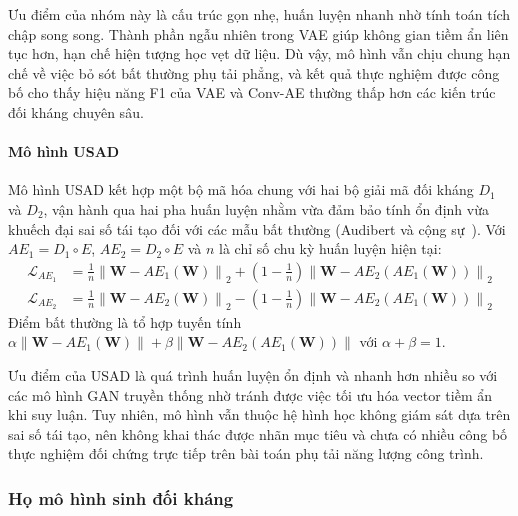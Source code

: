 Ưu điểm của nhóm này là cấu trúc gọn nhẹ, huấn luyện nhanh nhờ tính toán tích chập song song. Thành phần ngẫu nhiên trong VAE giúp không gian tiềm ẩn liên tục hơn, hạn chế hiện tượng học vẹt dữ liệu. Dù vậy, mô hình vẫn chịu chung hạn chế về việc bỏ sót bất thường phụ tải phẳng, và kết quả thực nghiệm được công bố cho thấy hiệu năng F1 của VAE và Conv-AE thường thấp hơn các kiến trúc đối kháng chuyên sâu.

\paragraph{Mô hình USAD}

Mô hình USAD kết hợp một bộ mã hóa chung với hai bộ giải mã đối kháng $D_1$ và $D_2$, vận hành qua hai pha huấn luyện nhằm vừa đảm bảo tính ổn định vừa khuếch đại sai số tái tạo đối với các mẫu bất thường (Audibert và cộng sự~\cite{usad}). Với $AE_1 = D_1 \circ E$, $AE_2 = D_2 \circ E$ và $n$ là chỉ số chu kỳ huấn luyện hiện tại:
\begin{equation*}
\begin{aligned}
    \mathcal{L}_{AE_1} &= \frac{1}{n}\left\| \mathbf{W} - AE_1(\mathbf{W}) \right\|_2 + \left(1 - \frac{1}{n}\right)\left\| \mathbf{W} - AE_2\left(AE_1(\mathbf{W})\right) \right\|_2 \\
    \mathcal{L}_{AE_2} &= \frac{1}{n}\left\| \mathbf{W} - AE_2(\mathbf{W}) \right\|_2 - \left(1 - \frac{1}{n}\right)\left\| \mathbf{W} - AE_2\left(AE_1(\mathbf{W})\right) \right\|_2
\end{aligned}
\end{equation*}
Điểm bất thường là tổ hợp tuyến tính $\alpha \left\| \mathbf{W} - AE_1(\mathbf{W}) \right\| + \beta \left\| \mathbf{W} - AE_2(AE_1(\mathbf{W})) \right\|$ với $\alpha + \beta = 1$.

Ưu điểm của USAD là quá trình huấn luyện ổn định và nhanh hơn nhiều so với các mô hình GAN truyền thống nhờ tránh được việc tối ưu hóa vector tiềm ẩn khi suy luận. Tuy nhiên, mô hình vẫn thuộc hệ hình học không giám sát dựa trên sai số tái tạo, nên không khai thác được nhãn mục tiêu và chưa có nhiều công bố thực nghiệm đối chứng trực tiếp trên bài toán phụ tải năng lượng công trình.

\subsubsection{Họ mô hình sinh đối kháng}

